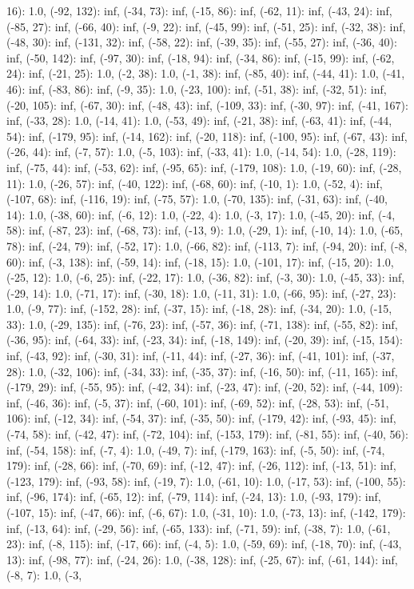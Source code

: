 \documentclass[parskip=half]{scrartcl}
\begin{document}
16): 1.0, (-92, 132): inf, (-34, 73): inf, (-15, 86): inf, (-62, 11): inf, (-43, 24): inf, (-85, 27): inf, (-66, 40): inf, (-9, 22): inf, (-45, 99): inf, (-51, 25): inf, (-32, 38): inf, (-48, 30): inf, (-131, 32): inf, (-58, 22): inf, (-39, 35): inf, (-55, 27): inf, (-36, 40): inf, (-50, 142): inf, (-97, 30): inf, (-18, 94): inf, (-34, 86): inf, (-15, 99): inf, (-62, 24): inf, (-21, 25): 1.0, (-2, 38): 1.0, (-1, 38): inf, (-85, 40): inf, (-44, 41): 1.0, (-41, 46): inf, (-83, 86): inf, (-9, 35): 1.0, (-23, 100): inf, (-51, 38): inf, (-32, 51): inf, (-20, 105): inf, (-67, 30): inf, (-48, 43): inf, (-109, 33): inf, (-30, 97): inf, (-41, 167): inf, (-33, 28): 1.0, (-14, 41): 1.0, (-53, 49): inf, (-21, 38): inf, (-63, 41): inf, (-44, 54): inf, (-179, 95): inf, (-14, 162): inf, (-20, 118): inf, (-100, 95): inf, (-67, 43): inf, (-26, 44): inf, (-7, 57): 1.0, (-5, 103): inf, (-33, 41): 1.0, (-14, 54): 1.0, (-28, 119): inf, (-75, 44): inf, (-53, 62): inf, (-95, 65): inf, (-179, 108): 1.0, (-19, 60): inf, (-28, 11): 1.0, (-26, 57): inf, (-40, 122): inf, (-68, 60): inf, (-10, 1): 1.0, (-52, 4): inf, (-107, 68): inf, (-116, 19): inf, (-75, 57): 1.0, (-70, 135): inf, (-31, 63): inf, (-40, 14): 1.0, (-38, 60): inf, (-6, 12): 1.0, (-22, 4): 1.0, (-3, 17): 1.0, (-45, 20): inf, (-4, 58): inf, (-87, 23): inf, (-68, 73): inf, (-13, 9): 1.0, (-29, 1): inf, (-10, 14): 1.0, (-65, 78): inf, (-24, 79): inf, (-52, 17): 1.0, (-66, 82): inf, (-113, 7): inf, (-94, 20): inf, (-8, 60): inf, (-3, 138): inf, (-59, 14): inf, (-18, 15): 1.0, (-101, 17): inf, (-15, 20): 1.0, (-25, 12): 1.0, (-6, 25): inf, (-22, 17): 1.0, (-36, 82): inf, (-3, 30): 1.0, (-45, 33): inf, (-29, 14): 1.0, (-71, 17): inf, (-30, 18): 1.0, (-11, 31): 1.0, (-66, 95): inf, (-27, 23): 1.0, (-9, 77): inf, (-152, 28): inf, (-37, 15): inf, (-18, 28): inf, (-34, 20): 1.0, (-15, 33): 1.0, (-29, 135): inf, (-76, 23): inf, (-57, 36): inf, (-71, 138): inf, (-55, 82): inf, (-36, 95): inf, (-64, 33): inf, (-23, 34): inf, (-18, 149): inf, (-20, 39): inf, (-15, 154): inf, (-43, 92): inf, (-30, 31): inf, (-11, 44): inf, (-27, 36): inf, (-41, 101): inf, (-37, 28): 1.0, (-32, 106): inf, (-34, 33): inf, (-35, 37): inf, (-16, 50): inf, (-11, 165): inf, (-179, 29): inf, (-55, 95): inf, (-42, 34): inf, (-23, 47): inf, (-20, 52): inf, (-44, 109): inf, (-46, 36): inf, (-5, 37): inf, (-60, 101): inf, (-69, 52): inf, (-28, 53): inf, (-51, 106): inf, (-12, 34): inf, (-54, 37): inf, (-35, 50): inf, (-179, 42): inf, (-93, 45): inf, (-74, 58): inf, (-42, 47): inf, (-72, 104): inf, (-153, 179): inf, (-81, 55): inf, (-40, 56): inf, (-54, 158): inf, (-7, 4): 1.0, (-49, 7): inf, (-179, 163): inf, (-5, 50): inf, (-74, 179): inf, (-28, 66): inf, (-70, 69): inf, (-12, 47): inf, (-26, 112): inf, (-13, 51): inf, (-123, 179): inf, (-93, 58): inf, (-19, 7): 1.0, (-61, 10): 1.0, (-17, 53): inf, (-100, 55): inf, (-96, 174): inf, (-65, 12): inf, (-79, 114): inf, (-24, 13): 1.0, (-93, 179): inf, (-107, 15): inf, (-47, 66): inf, (-6, 67): 1.0, (-31, 10): 1.0, (-73, 13): inf, (-142, 179): inf, (-13, 64): inf, (-29, 56): inf, (-65, 133): inf, (-71, 59): inf, (-38, 7): 1.0, (-61, 23): inf, (-8, 115): inf, (-17, 66): inf, (-4, 5): 1.0, (-59, 69): inf, (-18, 70): inf, (-43, 13): inf, (-98, 77): inf, (-24, 26): 1.0, (-38, 128): inf, (-25, 67): inf, (-61, 144): inf, (-8, 7): 1.0, (-3, 
\end{document}
